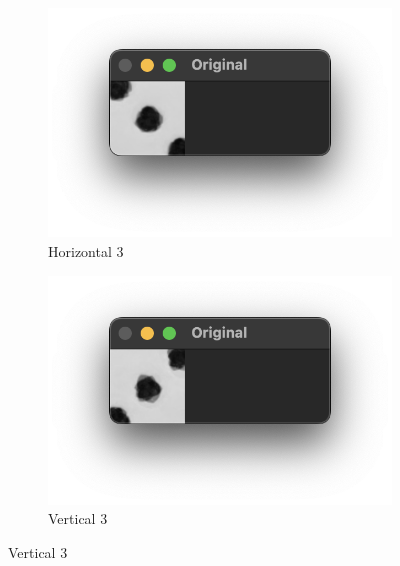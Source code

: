 \documentclass[12pt]{article}
\begin{document}
    \begin{figure}[!h]
        \centering
        \caption{Templates Creation}
        \label{fig:templates-creation}
        \begin{subfigure}{.5\textwidth}
            \centering
            \includegraphics[width=0.9\linewidth]{images/templates_no_preprocess/horizontal/3.png}
            \caption{Horizontal 3}
            \label{fig:tc-h3}
        \end{subfigure}%
        \begin{subfigure}{.5\textwidth}
            \centering
            \includegraphics[width=0.9\linewidth]
            {images/templates_no_preprocess/vertical/3.png}
            \caption{Vertical 3}
            \label{fig:tc-v3}
        \end{subfigure}
    \end{figure}
\end{document}

